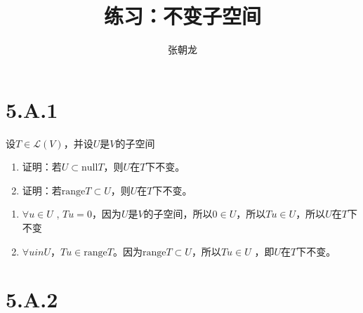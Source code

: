 \documentclass[10pt,a4paper,UTF8]{article}
\author{张朝龙}
\date{}
\title{练习：不变子空间}
\begin{document}
\maketitle
\tableofcontents
{}

\section{5.A.1}
\label{sec:org0e92b8d}


\begin{problem}
设\(T\in \mathcal{L}(V)\)，并设\(U\)是\(V\)的子空间
\begin{enumerate}
\item 证明：若\(U\subset \mathrm{null} T\)，则\(U\)在\(T\)下不变。
\item 证明：若\(\mathrm{range} T \subset U\)，则\(U\)在\(T\)下不变。
\end{enumerate}
\end{problem}

\begin{answer}
\begin{enumerate}
\item \(\forall u\in U\) , \(Tu = 0\)，因为\(U\)是\(V\)的子空间，所以\(0\in U\)，所以\(Tu\in U\)，所以\(U\)在\(T\)下不变
\item \(\forall u in U\)，\(Tu \in \mathrm{range}T\)。因为\(\mathrm{range} T \subset U\)，所以\(Tu \in U\) ，即\(U\)在\(T\)下不变。
\end{enumerate}
\end{answer}
\section{5.A.2}
\label{sec:org0897426}
\end{document}
